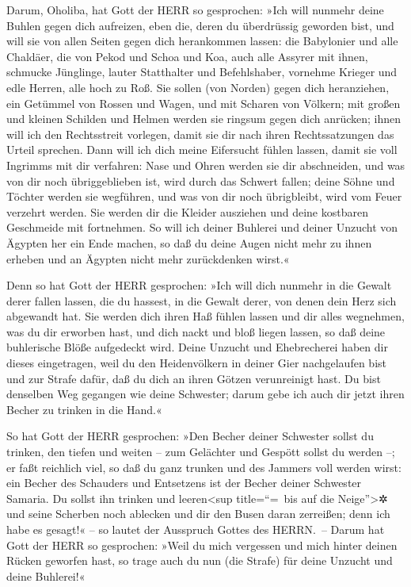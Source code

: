 Darum, Oholiba, hat Gott der HERR so gesprochen: »Ich
will nunmehr deine Buhlen gegen dich aufreizen, eben die, deren du
überdrüssig geworden bist, und will sie von allen Seiten gegen dich
herankommen lassen: die Babylonier und alle Chaldäer, die
von Pekod und Schoa und Koa, auch alle Assyrer mit ihnen, schmucke
Jünglinge, lauter Statthalter und Befehlshaber, vornehme Krieger und
edle Herren, alle hoch zu Roß. Sie sollen (von Norden)
gegen dich heranziehen, ein Getümmel von Rossen und Wagen, und mit
Scharen von Völkern; mit großen und kleinen Schilden und Helmen werden
sie ringsum gegen dich anrücken; ihnen will ich den Rechtsstreit
vorlegen, damit sie dir nach ihren Rechtssatzungen das Urteil sprechen.
Dann will ich dich meine Eifersucht fühlen lassen, damit
sie voll Ingrimms mit dir verfahren: Nase und Ohren werden sie dir
abschneiden, und was von dir noch übriggeblieben ist, wird durch das
Schwert fallen; deine Söhne und Töchter werden sie wegführen, und was
von dir noch übrigbleibt, wird vom Feuer verzehrt werden.
Sie werden dir die Kleider ausziehen und deine kostbaren
Geschmeide mit fortnehmen. So will ich deiner Buhlerei
und deiner Unzucht von Ägypten her ein Ende machen, so daß du deine
Augen nicht mehr zu ihnen erheben und an Ägypten nicht mehr zurückdenken
wirst.«

Denn so hat Gott der HERR gesprochen: »Ich will dich
nunmehr in die Gewalt derer fallen lassen, die du hassest, in die Gewalt
derer, von denen dein Herz sich abgewandt hat. Sie werden
dich ihren Haß fühlen lassen und dir alles wegnehmen, was du dir
erworben hast, und dich nackt und bloß liegen lassen, so daß deine
buhlerische Blöße aufgedeckt wird. Deine Unzucht und Ehebrecherei
haben dir dieses eingetragen, weil du den Heidenvölkern
in deiner Gier nachgelaufen bist und zur Strafe dafür, daß du dich an
ihren Götzen verunreinigt hast. Du bist denselben Weg
gegangen wie deine Schwester; darum gebe ich auch dir jetzt ihren Becher
zu trinken in die Hand.«

So hat Gott der HERR gesprochen: »Den Becher deiner
Schwester sollst du trinken, den tiefen und weiten -- zum Gelächter und
Gespött sollst du werden --; er faßt reichlich viel, so
daß du ganz trunken und des Jammers voll werden wirst: ein Becher des
Schauders und Entsetzens ist der Becher deiner Schwester Samaria.
Du sollst ihn trinken und leeren\textless sup
title=``=~bis auf die Neige''\textgreater✲ und seine Scherben noch
ablecken und dir den Busen daran zerreißen; denn ich habe es gesagt!« --
so lautet der Ausspruch Gottes des HERRN.~-- Darum hat
Gott der HERR so gesprochen: »Weil du mich vergessen und mich hinter
deinen Rücken geworfen hast, so trage auch du nun (die Strafe) für deine
Unzucht und deine Buhlerei!«

